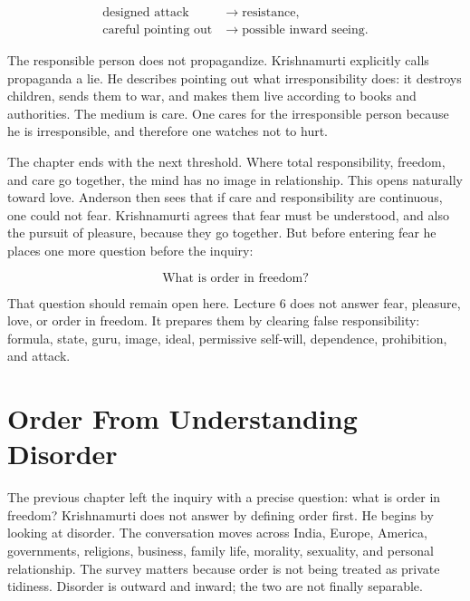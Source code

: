 \documentclass[11pt,oneside]{book}
\begin{document}
\begin{align}
\text{designed attack}
&\longrightarrow
\text{resistance},\\
\text{careful pointing out}
&\longrightarrow
\text{possible inward seeing}.
\end{align}

The responsible person does not propagandize. Krishnamurti explicitly calls propaganda a lie. He describes pointing out what irresponsibility does: it destroys children, sends them to war, and makes them live according to books and authorities. The medium is care. One cares for the irresponsible person because he is irresponsible, and therefore one watches not to hurt.

The chapter ends with the next threshold. Where total responsibility, freedom, and care go together, the mind has no image in relationship. This opens naturally toward love. Anderson then sees that if care and responsibility are continuous, one could not fear. Krishnamurti agrees that fear must be understood, and also the pursuit of pleasure, because they go together. But before entering fear he places one more question before the inquiry:

\begin{equation}
\text{What is order in freedom?}
\end{equation}

That question should remain open here. Lecture 6 does not answer fear, pleasure, love, or order in freedom. It prepares them by clearing false responsibility: formula, state, guru, image, ideal, permissive self-will, dependence, prohibition, and attack.


\chapter{Order From Understanding Disorder}

The previous chapter left the inquiry with a precise question: what is order in freedom? Krishnamurti does not answer by defining order first. He begins by looking at disorder. The conversation moves across India, Europe, America, governments, religions, business, family life, morality, sexuality, and personal relationship. The survey matters because order is not being treated as private tidiness. Disorder is outward and inward; the two are not finally separable.
\end{document}
